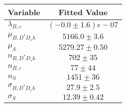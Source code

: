 \begin{tabular}[t]{lc}
\hline
Variable &Fitted Value\\
\hline\hline
$\lambda_{B,c}$&$(-0.0\pm1.6)e-07$\\
\hline
$\mu_{B, D^* D_s h}$&$5166.0\pm3.6$\\
\hline
$\mu_S$&$5279.27\pm0.50$\\
\hline
$n_{B, D^* D_s h}$&$702\pm35$\\
\hline
$n_{B,c}$&$77\pm44$\\
\hline
$n_S$&$1451\pm36$\\
\hline
$\sigma_{B, D^* D_s h}$&$27.9\pm2.5$\\
\hline
$\sigma_S$&$12.39\pm0.42$\\
\hline
\end{tabular}